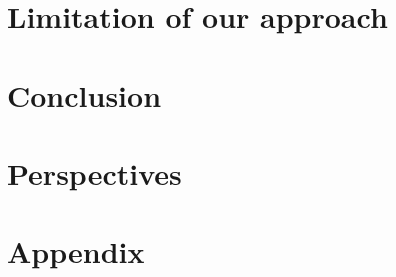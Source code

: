 \documentclass[oneside, a4paper, onecolumn, 11pt]{article}
\begin{document}
\section{Limitation of our approach}

\section{Conclusion}

\section{Perspectives}

\newpage
\nocite{*}



\newpage
\appendix

\section{Appendix}
\label{appendix}
\end{document}
